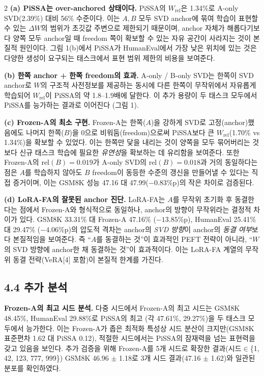\documentclass[a4paper,10pt]{article}
\begin{document}
\begin{multicols}{2}
\textbf{(a) PiSSA는 over-anchored 상태이다.} PiSSA의 $W_{\text{rel}}$은 1.34\%로 A-only SVD(2.39\%) 대비 56\% 수준이다. 이는 $A,B$ 모두 SVD anchor에 묶여 학습이 표현할 수 있는 $\Delta W$의 범위가 초깃값 주변으로 제한되기 때문이며, anchor 자체가 해롭다기보다 양쪽 모두 anchor일 때 freedom 쪽이 확보할 수 있는 자유 공간이 사라지는 것이 본질적 원인이다. 그림 1(b)에서 PiSSA가 HumanEval에서 가장 낮은 위치에 있는 것은 다양한 생성이 요구되는 태스크에서 표현 범위 제한의 비용을 보여준다.

\textbf{(b) 한쪽 anchor + 한쪽 freedom의 효과.} A-only / B-only SVD는 한쪽이 SVD anchor로 $W$의 구조적 사전정보를 제공하는 동시에 다른 한쪽이 무작위에서 자유롭게 학습되어 $W_{\text{rel}}$이 PiSSA의 약 1.8--1.9배에 달한다. 이 추가 용량이 두 태스크 모두에서 PiSSA를 능가하는 결과로 이어진다 (그림 1).

\textbf{(c) Frozen-A의 최소 구현.} Frozen-A는 한쪽($A$)을 강하게 SVD로 고정(anchor)했음에도 나머지 한쪽($B$)을 0으로 비워둠(freedom)으로써 PiSSA보다 큰 $W_{\text{rel}}$(1.70\% vs 1.34\%)을 확보할 수 있었다. 이는 한쪽만 닻을 내리는 것이 양쪽을 모두 묶어버리는 것보다 신규 태스크 학습에 필요한 \textit{유연성}을 확보하는 데 유리함을 보여준다. 또한 Frozen-A의 $\text{rel}(B)=0.019$가 A-only SVD의 $\text{rel}(B)=0.018$과 거의 동일하다는 점은 $A$를 학습하지 않아도 $B$ freedom이 동등한 수준의 갱신을 만들어낼 수 있다는 직접 증거이며, 이는 GSM8K 성능 47.16 대 47.99($-0.83$\%p)의 작은 차이로 검증된다.

\textbf{(d) LoRA-FA의 잘못된 anchor 진단.} LoRA-FA는 $A$를 무작위 초기화 후 동결한다는 점에서 Frozen-A와 형식적으로 동일하나, anchor의 방향이 무작위라는 결정적 차이가 있다. GSM8K 33.31\% 대 Frozen-A 47.16\% ($-13.85$\%p), HumanEval 25.41\% 대 29.47\% ($-4.06$\%p)의 압도적 격차는 anchor의 \textit{SVD 방향}이 anchor의 \textit{동결 여부}보다 본질적임을 보여준다. 즉 ``$A$를 동결하는 것''이 효과적인 PEFT 전략이 아니라, ``$W$의 SVD 방향에 anchor한 채 동결하는 것''이 효과적이다. 이는 LoRA-FA 계열의 무작위 동결 전략(VeRA[4] 포함)이 본질적 한계를 가진다.

\subsection*{4.4 추가 분석}

\textbf{Frozen-A의 최고 시드 분석.} 다중 시드에서 Frozen-A의 최고 시드는 GSM8K 48.45\%, HumanEval 29.88\%로 PiSSA의 최고 (각 47.61\%, 29.27\%)을 두 태스크 모두에서 능가한다. 이는 Frozen-A가 좁은 최적화 특성상 시드 분산이 크지만(GSM8K 표준편차 1.62 대 PiSSA 0.12), 적절한 시드에서는 PiSSA의 잠재력을 넘는 표현력을 갖고 있음을 보인다. 추가 검증을 위해 Frozen-A를 5개 시드로 확장한 결과(시드$\in$\{1, 42, 123, 777, 999\}) GSM8K 46.96 $\pm$ 1.18로 3개 시드 결과(47.16 $\pm$ 1.62)와 일관된 분포를 확인하였다.


\end{multicols}
\end{document}
